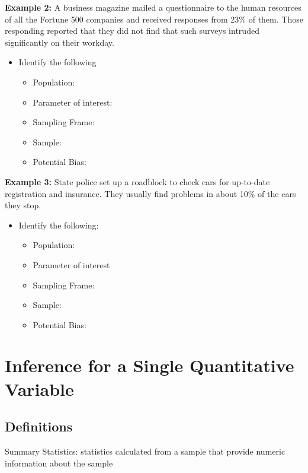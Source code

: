 \documentclass[
  letterpaper,
  DIV=11,
  numbers=noendperiod]{scrartcl}
\begin{document}
\textbf{Example 2:} A business magazine mailed a questionnaire to the
human resources of all the Fortune 500 companies and received responses
from 23\% of them. Those responding reported that they did not find that
such surveys intruded significantly on their workday.

\begin{itemize}
\item
  Identify the following

  \begin{itemize}
  \item
    Population:
  \item
    Parameter of interest:
  \item
    Sampling Frame:
  \item
    Sample:
  \item
    Potential Bias:
  \end{itemize}
\end{itemize}

\textbf{Example 3:} State police set up a roadblock to check cars for
up-to-date registration and insurance. They usually find problems in
about 10\% of the cars they stop.

\begin{itemize}
\item
  Identify the following:

  \begin{itemize}
  \item
    Population:
  \item
    Parameter of interest
  \item
    Sampling Frame:
  \item
    Sample:
  \item
    Potential Bias:
  \end{itemize}
\end{itemize}

\section{Inference for a Single Quantitative
Variable}\label{inference-for-a-single-quantitative-variable}

\subsection{Definitions}\label{definitions-1}

Summary Statistics: statistics calculated from a sample that provide
numeric information about the sample
\end{document}

